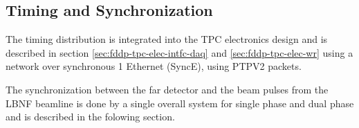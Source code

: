 \subsection{Timing and Synchronization}
\label{sec:fd-daq-timing}


The timing distribution is integrated into the TPC electronics design
and is described in section \ref{sec:fddp-tpc-elec-intfc-daq} and
\ref{sec:fddp-tpc-elec-wr} using a  network over
synchronous \SI{1}{\Gbps} Ethernet (SyncE), using PTPV2 packets.

The synchronization between the far detector and the beam pulses from
the LBNF beamline is done by a single overall system for single phase
and dual phase and is described in the folowing section.


